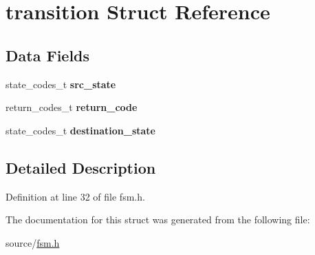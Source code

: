 \hypertarget{structtransition}{}\section{transition Struct Reference}
\label{structtransition}
\subsection*{Data Fields}
\begin{DoxyCompactItemize}
\item 
state\+\_\+codes\+\_\+t {\bfseries src\+\_\+state}\hypertarget{structtransition_aface180c1b7e268ee434c9345069ef9a}{}\label{structtransition_aface180c1b7e268ee434c9345069ef9a}

\item 
return\+\_\+codes\+\_\+t {\bfseries return\+\_\+code}\hypertarget{structtransition_ae9946d3b2fde2a6af4a08763cbdef682}{}\label{structtransition_ae9946d3b2fde2a6af4a08763cbdef682}

\item 
state\+\_\+codes\+\_\+t {\bfseries destination\+\_\+state}\hypertarget{structtransition_a8e0c6c5a7221b92e8722acdb01627a5f}{}\label{structtransition_a8e0c6c5a7221b92e8722acdb01627a5f}

\end{DoxyCompactItemize}


\subsection{Detailed Description}


Definition at line 32 of file fsm.\+h.



The documentation for this struct was generated from the following file\+:\begin{DoxyCompactItemize}
\item 
source/\hyperlink{fsm_8h}{fsm.\+h}\end{DoxyCompactItemize}
